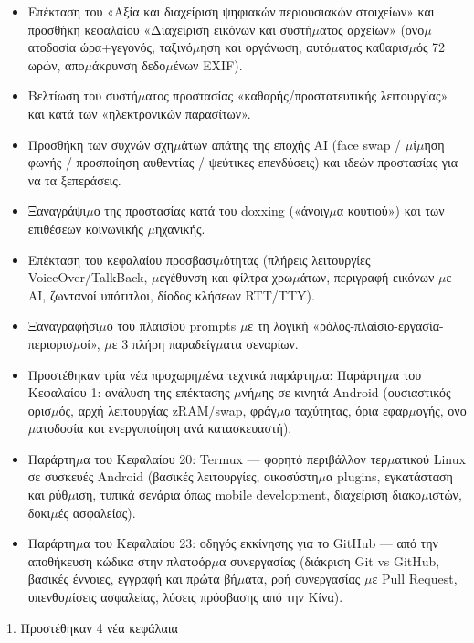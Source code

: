 \begin{itemize}
  \item Επέκταση του «Αξία και διαχείριση ψηφιακών περιουσιακών στοιχείων» και προσθήκη κεφαλαίου «Διαχείριση εικόνων και συστή$\mu$ατος αρχείων» (ονο$\mu$ατοδοσία ώρα+γεγονός, ταξινό$\mu$ηση και οργάνωση, αυτό$\mu$ατος καθαρισ$\mu$ός 72 ωρών, απο$\mu$άκρυνση δεδο$\mu$ένων EXIF).
  \item Βελτίωση του συστή$\mu$ατος προστασίας «καθαρής/προστατευτικής λειτουργίας» και κατά των «ηλεκτρονικών παρασίτων».
  \item Προσθήκη των συχνών σχη$\mu$άτων απάτης της εποχής AI (face swap / $\mu$ί$\mu$ηση φωνής / προσποίηση αυθεντίας / ψεύτικες επενδύσεις) και ιδεών προστασίας για να τα ξεπεράσεις.
  \item Ξαναγράψι$\mu$ο της προστασίας κατά του doxxing («άνοιγ$\mu$α κουτιού») και των επιθέσεων κοινωνικής $\mu$ηχανικής.
  \item Επέκταση του κεφαλαίου προσβασι$\mu$ότητας (πλήρεις λειτουργίες VoiceOver/TalkBack, $\mu$εγέθυνση και φίλτρα χρω$\mu$άτων, περιγραφή εικόνων $\mu$ε AI, ζωντανοί υπότιτλοι, δίοδος κλήσεων RTT/TTY).
  \item Ξαναγραφήσι$\mu$ο του πλαισίου prompts $\mu$ε τη λογική «ρόλος-πλαίσιο-εργασία-περιορισ$\mu$οί», $\mu$ε 3 πλήρη παραδείγ$\mu$ατα σεναρίων.
  \item Προστέθηκαν τρία νέα προχωρη$\mu$ένα τεχνικά παράρτη$\mu$α: Παράρτη$\mu$α του Κεφαλαίου 1: ανάλυση της επέκτασης $\mu$νή$\mu$ης σε κινητά Android (ουσιαστικός ορισ$\mu$ός, αρχή λειτουργίας zRAM/swap, φράγ$\mu$α ταχύτητας, όρια εφαρ$\mu$ογής, ονο$\mu$ατοδοσία και ενεργοποίηση ανά κατασκευαστή).
  \item Παράρτη$\mu$α του Κεφαλαίου 20: Termux — φορητό περιβάλλον τερ$\mu$ατικού Linux σε συσκευές Android (βασικές λειτουργίες, οικοσύστη$\mu$α plugins, εγκατάσταση και ρύθ$\mu$ιση, τυπικά σενάρια όπως mobile development, διαχείριση διακο$\mu$ιστών, δοκι$\mu$ές ασφαλείας).
  \item Παράρτη$\mu$α του Κεφαλαίου 23: οδηγός εκκίνησης για το GitHub — από την αποθήκευση κώδικα στην πλατφόρ$\mu$α συνεργασίας (διάκριση Git vs GitHub, βασικές έννοιες, εγγραφή και πρώτα βή$\mu$ατα, ροή συνεργασίας $\mu$ε Pull Request, υπενθυ$\mu$ίσεις ασφαλείας, λύσεις πρόσβασης από την Κίνα).
\end{itemize}


1. Προστέθηκαν 4 νέα κεφάλαια


